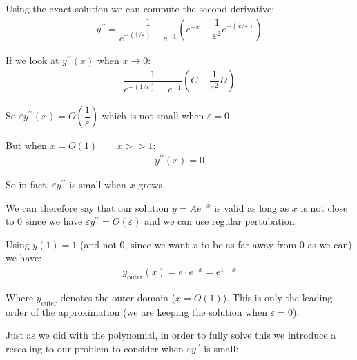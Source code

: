 \par\bigskip
\noindent Using the exact solution we can compute the second derivative:
\begin{equation*}
  \begin{gathered}
    y^{\prime\prime} = \dfrac{1}{e^{-(1/\varepsilon)}-e^{-1}}\left(e^{-x}-\dfrac{1}{\varepsilon^2}e^{-(x/\varepsilon)}\right)
  \end{gathered}
\end{equation*}
\par\bigskip
\noindent If we look at $y^{\prime\prime}(x)$ when $x\to0$:
\begin{equation*}
  \begin{gathered}
    \dfrac{1}{e^{-(1/\varepsilon)}-e^{-1}}\left(C-\dfrac{1}{\varepsilon^2}D\right)
  \end{gathered}
\end{equation*}\par
\noindent So $\varepsilon y^{\prime\prime}(x) = O\left(\dfrac{1}{\varepsilon}\right)$ which is not small when $\varepsilon=0$ \par
\noindent But when $x = O(1)\qquad x>>1$:
\begin{equation*}
  \begin{gathered}
    y^{\prime\prime}(x) = 0
  \end{gathered}
\end{equation*}\par
\noindent So in fact, $\varepsilon y^{\prime\prime}$ is small when $x$ grows.
\par\bigskip
\noindent We can therefore say that our solution $y = Ae^{-x}$ is valid as long as $x$ is not close to 0 since we have $\varepsilon y^{\prime\prime} = O(\varepsilon)$ and we can use regular pertubation.\par
\noindent Using $y(1) = 1$ (and not 0, since we want $x$ to be as far away from 0 as we can) we have:
\begin{equation*}
  \begin{gathered}
    y_{\text{outer}}(x) = e\cdot e^{-x} = e^{1-x}
  \end{gathered}
\end{equation*}\par
\noindent Where $y_{\text{outer}}$ denotes the outer domain ($x = O(1)$).  This is only the leading order of the approximation (we are keeping the solution when $\varepsilon=0$).
\par\bigskip
\noindent Just as we did with the polynomial, in order to fully solve this we introduce a rescaling to our problem to consider when $\varepsilon y^{\prime\prime}$ is small:
